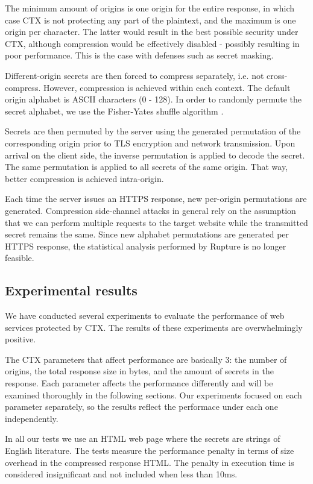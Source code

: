 The minimum amount of origins is one origin for the entire response, in which
case CTX is not protecting any part of the plaintext, and the maximum is one
origin per character. The latter would result in the best possible security
under CTX, although compression would be effectively disabled - possibly resulting
in poor performance. This is the case with defenses such as secret masking.

Different-origin secrets are then forced to compress separately, i.e. not
cross-compress. However, compression is achieved within each context. The
default origin alphabet is ASCII characters (0 - 128). In order to randomly
permute the secret alphabet, we use the Fisher-Yates shuffle
algorithm \cite{fisher1938statistical}.

Secrets are then permuted by the server using the generated permutation of the
corresponding origin prior to TLS encryption and network transmission. Upon
arrival on the client side, the inverse permutation is applied to decode the
secret. The same permutation is applied to all secrets of the same origin. That
way, better compression is achieved intra-origin.

Each time the server issues an HTTPS response, new per-origin permutations are
generated. Compression side-channel attacks in general rely on the assumption that we can
perform multiple requests to the target website while the transmitted secret
remains the same. Since new alphabet permutations are generated per HTTPS
response, the statistical analysis performed by Rupture is no longer feasible.

\subsection{Experimental results}\label{subsec:ctx_experiments}

We have conducted several experiments to evaluate the performance of web
services protected by CTX. The results of these experiments are overwhelmingly
positive.

The CTX parameters that affect performance are basically 3: the number of
origins, the total response size in bytes, and the amount of
secrets in the response. Each parameter affects the performance differently and
will be examined thoroughly in the following sections. Our experiments focused
on each parameter separately, so the results reflect the performace under each
one independently.

In all our tests we use an HTML web page where the secrets are strings of
English literature. The tests measure the performance penalty in terms of size
overhead in the compressed response HTML. The penalty in execution time is
considered insignificant and not included when less than 10ms.

